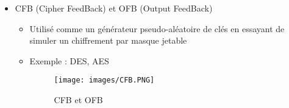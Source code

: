 \documentclass[a4paper]{article}
\begin{document}
\begin{itemize}[label=\textbullet, font=\Large]
\begin{itemize}[label=, font=\scriptsize]
\begin{itemize}
\begin{itemize}
            \end{itemize}
            \item CFB (Cipher FeedBack) et OFB (Output FeedBack)
            \begin{itemize}
                \item Utilisé comme un générateur pseudo-aléatoire de clés en essayant de simuler un chiffrement par masque jetable
                \item Exemple : DES, AES
                \begin{figure}[H]
                    \centering
                    \texttt{[image: images/CFB.PNG]}
                    \caption{CFB et OFB}
                \end{figure}
            \end{itemize}
        \end{itemize}
    \end{itemize}
\end{itemize}
\end{document}
